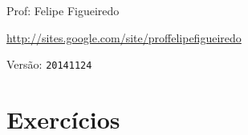 \documentclass[a4paper]{article}
\begin{document}
\parbox[c]{.825\textwidth}{\raggedright%
{Prof: Felipe Figueiredo\par}
{\url{http://sites.google.com/site/proffelipefigueiredo}\par}
}

Versão: \verb|20141124|




\section{Exercícios}
\end{document}
